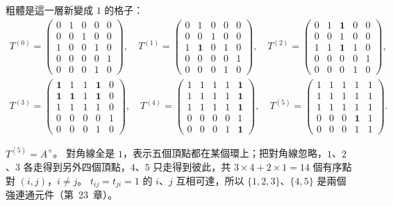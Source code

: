 粗體是這一層新變成 $1$ 的格子：
\begin{gather*}
T^{(0)} = \begin{pmatrix} 0&1&0&0&0 \\ 0&0&1&0&0 \\ 1&0&0&1&0 \\ 0&0&0&0&1 \\ 0&0&0&1&0 \end{pmatrix},\quad
T^{(1)} = \begin{pmatrix} 0&1&0&0&0 \\ 0&0&1&0&0 \\ 1&\mathbf{1}&0&1&0 \\ 0&0&0&0&1 \\ 0&0&0&1&0 \end{pmatrix},\quad
T^{(2)} = \begin{pmatrix} 0&1&\mathbf{1}&0&0 \\ 0&0&1&0&0 \\ 1&1&\mathbf{1}&1&0 \\ 0&0&0&0&1 \\ 0&0&0&1&0 \end{pmatrix}, \\
T^{(3)} = \begin{pmatrix} \mathbf{1}&1&1&\mathbf{1}&0 \\ \mathbf{1}&\mathbf{1}&1&\mathbf{1}&0 \\ 1&1&1&1&0 \\ 0&0&0&0&1 \\ 0&0&0&1&0 \end{pmatrix},\quad
T^{(4)} = \begin{pmatrix} 1&1&1&1&\mathbf{1} \\ 1&1&1&1&\mathbf{1} \\ 1&1&1&1&\mathbf{1} \\ 0&0&0&0&1 \\ 0&0&0&1&\mathbf{1} \end{pmatrix},\quad
T^{(5)} = \begin{pmatrix} 1&1&1&1&1 \\ 1&1&1&1&1 \\ 1&1&1&1&1 \\ 0&0&0&\mathbf{1}&1 \\ 0&0&0&1&1 \end{pmatrix}.
\end{gather*}

$T^{(5)} = A^{+}$。 對角線全是 $1$，表示五個頂點都在某個環上；把對角線忽略，$1$、$2$、$3$
各走得到另外四個頂點，$4$、$5$ 只走得到彼此，共 $3 \times 4 + 2 \times 1 = 14$ 個有序點對
$(i, j)$，$i \ne j$。 $t_{ij} = t_{ji} = 1$ 的 $i$、$j$ 互相可達，所以 $\{1, 2, 3\}$、$\{4, 5\}$
是兩個強連通元件（第~23~章）。

